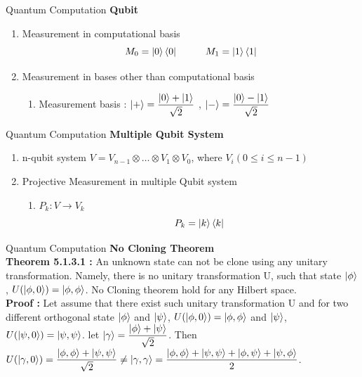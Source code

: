 \documentclass[xcolor=svgnames]{beamer}
\def\leq{\leqslant}
\newcommand{\tens}[1]{
  \mathbin{\mathop{\otimes}\limits_{#1}}}
\begin{document}
\begin{frame}{Quantum Computation}
\textbf{Qubit}
\begin{enumerate}
    \item Measurement in computational basis $$M_0 = \ket{0}\bra{0} \hspace{1cm} M_1 = \ket{1}\bra{1}$$
    \item Measurement in bases other than computational basis
    \begin{enumerate}
        \item Measurement basis : $\ket{+} = \dfrac{\ket{0}+\ket{1}}{\sqrt{2}}$ , $\ket{-} = \dfrac{\ket{0}-\ket{1}}{\sqrt{2}}$
        
    \end{enumerate}
\end{enumerate}
\end{frame}

\begin{frame}{Quantum Computation}
\textbf{Multiple Qubit System}
\begin{enumerate}
    \item n-qubit system $V = V_{n-1} \tens{} \hdots \tens{} V_1 \tens{} V_0$, where $V_i(0 \leq i \leq n-1) $
    \item Projective Measurement in multiple Qubit system
    \begin{enumerate}
        \item $P_k : V \rightarrow V_k$ $$P_k = \ket{k}\bra{k}$$
    \end{enumerate}
\end{enumerate}
\end{frame}


\begin{frame}{Quantum Computation}
\textbf{No Cloning Theorem}\\
\textbf{Theorem 5.1.3.1 :} An unknown state can not be clone using any unitary transformation. Namely, there is no unitary transformation U, such that state $\ket{\phi}$, $U(\ket{\phi,0}) = \ket{\phi,\phi}$. No Cloning theorem hold for any Hilbert space.\\
\textbf{Proof :} Let assume that there exist such unitary transformation U and for two different orthogonal state $\ket{\phi}$ and $\ket{\psi}$, $U(\ket{\phi,0}) = \ket{\phi,\phi}$ and $\ket{\psi}$, $U(\ket{\psi,0}) = \ket{\psi,\psi}$. let $\ket{\gamma} = \dfrac{\ket{\phi} + \ket{\psi}}{\sqrt{2}}$. Then $U(\ket{\gamma,0}) = \dfrac{\ket{\phi,\phi} + \ket{\psi,\psi}}{\sqrt{2}} \neq \ket{\gamma,\gamma} = \dfrac{\ket{\phi,\phi} + \ket{\psi,\psi} + \ket{\phi,\psi} + \ket{\psi,\phi}}{2}$.
\end{frame}
\end{document}
